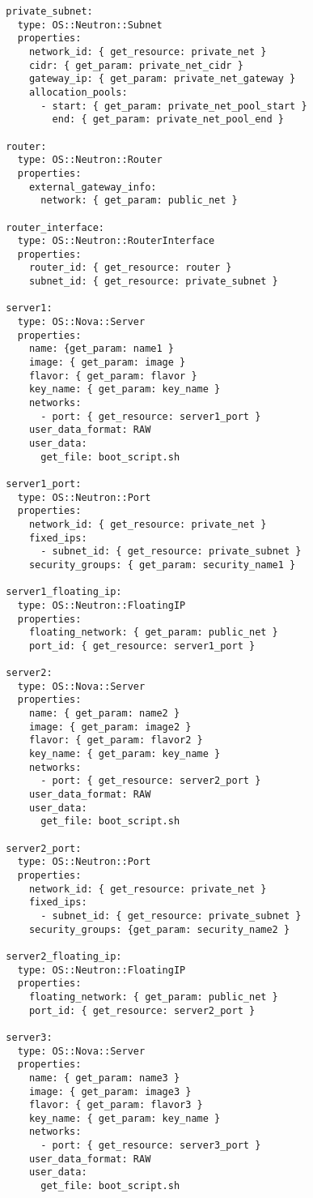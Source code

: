 \begin{verbatim}
  private_subnet:
    type: OS::Neutron::Subnet
    properties:
      network_id: { get_resource: private_net }
      cidr: { get_param: private_net_cidr }
      gateway_ip: { get_param: private_net_gateway }
      allocation_pools:
        - start: { get_param: private_net_pool_start }
          end: { get_param: private_net_pool_end }

  router:
    type: OS::Neutron::Router
    properties:
      external_gateway_info:
        network: { get_param: public_net }

  router_interface:
    type: OS::Neutron::RouterInterface
    properties:
      router_id: { get_resource: router }
      subnet_id: { get_resource: private_subnet }

  server1:
    type: OS::Nova::Server
    properties:
      name: {get_param: name1 }
      image: { get_param: image }
      flavor: { get_param: flavor }
      key_name: { get_param: key_name }
      networks:
        - port: { get_resource: server1_port }
      user_data_format: RAW
      user_data:
        get_file: boot_script.sh

  server1_port:
    type: OS::Neutron::Port
    properties:
      network_id: { get_resource: private_net }
      fixed_ips:
        - subnet_id: { get_resource: private_subnet }
      security_groups: { get_param: security_name1 }

  server1_floating_ip:
    type: OS::Neutron::FloatingIP
    properties:
      floating_network: { get_param: public_net }
      port_id: { get_resource: server1_port }

  server2:
    type: OS::Nova::Server
    properties:
      name: { get_param: name2 }
      image: { get_param: image2 }
      flavor: { get_param: flavor2 }
      key_name: { get_param: key_name }
      networks:
        - port: { get_resource: server2_port }
      user_data_format: RAW
      user_data:
        get_file: boot_script.sh

  server2_port:
    type: OS::Neutron::Port
    properties:
      network_id: { get_resource: private_net }
      fixed_ips:
        - subnet_id: { get_resource: private_subnet }
      security_groups: {get_param: security_name2 }

  server2_floating_ip:
    type: OS::Neutron::FloatingIP
    properties:
      floating_network: { get_param: public_net }
      port_id: { get_resource: server2_port }

  server3:
    type: OS::Nova::Server
    properties:
      name: { get_param: name3 }
      image: { get_param: image3 }
      flavor: { get_param: flavor3 }
      key_name: { get_param: key_name }
      networks:
        - port: { get_resource: server3_port }
      user_data_format: RAW
      user_data:
        get_file: boot_script.sh


\end{verbatim}
